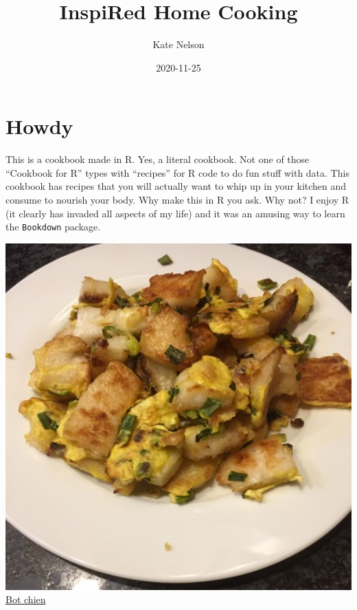 \documentclass[
]{book}
\title{InspiRed Home Cooking}
\author{Kate Nelson}
\date{2020-11-25}
\begin{document}
\maketitle

{
\setcounter{tocdepth}{1}
\tableofcontents
}
\hypertarget{howdy}{%
\chapter*{Howdy}\label{howdy}}

This is a cookbook made in R. Yes, a literal cookbook. Not one of those ``Cookbook for R'' types with ``recipes'' for R code to do fun stuff with data. This cookbook has recipes that you will actually want to whip up in your kitchen and consume to nourish your body. Why make this in R you ask. Why not? I enjoy R (it clearly has invaded all aspects of my life) and it was an amusing way to learn the \texttt{Bookdown} package.

\protect\hyperlink{botchien}{\includegraphics[width=1\textwidth,height=\textheight]{bot_chien_small.jpg}}
\protect\hyperlink{botchien}{Bot chien}
\end{document}
